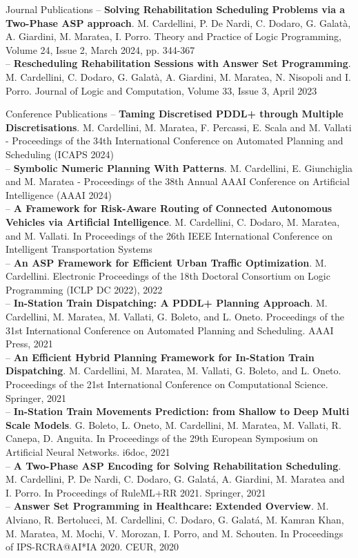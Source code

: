 \documentclass{resume} %
\begin{document}
\begin{rSection}{Journal Publications}
-- \textbf{Solving Rehabilitation Scheduling Problems via a Two-Phase ASP approach}. M. Cardellini, P. De Nardi, C. Dodaro, G. Galat\`a, A. Giardini, M. Maratea, I. Porro. Theory and Practice of Logic Programming, Volume 24, Issue 2, March 2024, pp. 344-367\\
-- \textbf{Rescheduling Rehabilitation Sessions with Answer Set Programming}. M. Cardellini, C. Dodaro, G. Galat\`a, A. Giardini, M. Maratea, N. Nisopoli and I. Porro. Journal of Logic and Computation, Volume 33, Issue 3, April 2023
\end{rSection}
\begin{rSection}{Conference Publications}
-- \textbf{Taming Discretised PDDL+ through Multiple Discretisations}. M. Cardellini, M. Maratea, F. Percassi, E. Scala and M. Vallati - Proceedings of the 34th International Conference on Automated Planning and Scheduling (ICAPS 2024)\\
-- \textbf{Symbolic Numeric Planning With Patterns}. M. Cardellini, E. Giunchiglia and M. Maratea - Proceedings of the 38th Annual AAAI Conference on Artificial Intelligence (AAAI 2024) \\
-- \textbf{A Framework for Risk-Aware Routing of Connected Autonomous Vehicles via Artificial Intelligence}. M. Cardellini, C. Dodaro, M. Maratea, and M. Vallati. In Proceedings of the 26th IEEE International Conference on Intelligent Transportation Systems \\
-- \textbf{An ASP Framework for Efficient Urban Traffic Optimization}. M. Cardellini. Electronic Proceedings of the 18th Doctoral Consortium on Logic Programming (ICLP DC 2022), 2022 \\
-- \textbf{In-Station Train Dispatching: A PDDL+ Planning Approach}. M. Cardellini, M. Maratea, M. Vallati, G. Boleto, and L. Oneto. Proceedings of the 31st International Conference on Automated Planning and Scheduling. AAAI Press, 2021 \\
-- \textbf{An Efficient Hybrid Planning Framework for In-Station Train Dispatching}. M. Cardellini, M. Maratea, M. Vallati, G. Boleto, and L. Oneto. Proceedings of the 21st International Conference on Computational Science. Springer, 2021 \\
-- \textbf{In-Station Train Movements Prediction: from Shallow to Deep Multi Scale Models}. G. Boleto, L. Oneto, M. Cardellini, M. Maratea, M. Vallati, R. Canepa, D. Anguita. In Proceedings of the 29th European Symposium on Artificial Neural Networks. i6doc, 2021\\
-- \textbf{A Two-Phase ASP Encoding for Solving Rehabilitation Scheduling}. M. Cardellini, P. De Nardi, C. Dodaro, G. Galat\'a, A. Giardini, M. Maratea and I. Porro. In Proceedings of RuleML+RR 2021. Springer, 2021\\
-- \textbf{Answer Set Programming in Healthcare: Extended Overview}. M. Alviano, R. Bertolucci, M. Cardellini, C. Dodaro, G. Galat\'a, M. Kamran Khan, M. Maratea, M. Mochi, V. Morozan, I. Porro, and M. Schouten. In Proceedings of IPS-RCRA@AI*IA 2020. CEUR, 2020
\end{rSection}
\end{document}
